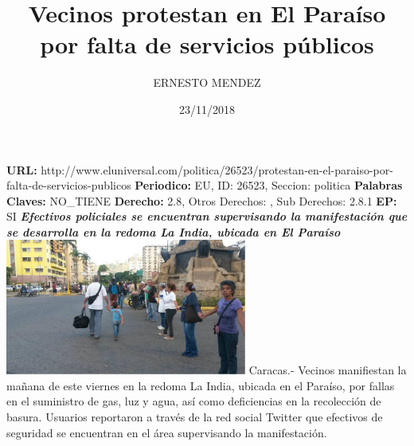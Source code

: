 \documentclass{article}%
\title{\textbf{Vecinos protestan en El Paraíso por falta de servicios públicos}}%
\author{ERNESTO MENDEZ}%
\date{23/11/2018}%
\begin{document}
%
\normalsize%
\maketitle%
\textbf{URL: }%
http://www.eluniversal.com/politica/26523/protestan{-}en{-}el{-}paraiso{-}por{-}falta{-}de{-}servicios{-}publicos\newline%
%
\textbf{Periodico: }%
EU, %
ID: %
26523, %
Seccion: %
politica\newline%
%
\textbf{Palabras Claves: }%
NO\_TIENE\newline%
%
\textbf{Derecho: }%
2.8, %
Otros Derechos: %
, %
Sub Derechos: %
2.8.1\newline%
%
\textbf{EP: }%
SI\newline%
\newline%
%
\textbf{\textit{Efectivos policiales se encuentran supervisando la manifestación que se desarrolla en la redoma La India, ubicada en El Paraíso}}%
\newline%
\newline%
%
\includegraphics[width=300px]{127.jpg}%
\newline%
%
Caracas.{-} Vecinos manifiestan la mañana de este viernes en%
\newline%
%
la redoma La India, ubicada en el Paraíso, por fallas en el suministro de gas, luz y agua, así como deficiencias en la recolección de basura.%
\newline%
%
Usuarios reportaron a través de la red social Twitter que efectivos de seguridad se encuentran en el área supervisando la manifestación.%
\newline%
%
\end{document}
